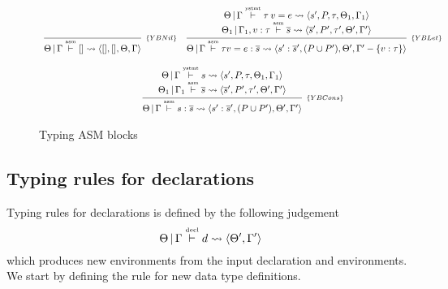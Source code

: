 \documentclass[a4paper, 11pt]{article}
\theoremstyle{definition}
\begin{document}
\begin{figure}[H]
  \[
    \begin{array}{cc}
      \infer[_{\{YBNil\}}]
            {\Theta\,|\,\Gamma \typing{asm} [] \leadsto \langle [], [], \Theta, \Gamma\rangle}
            {}
      &
      \infer[_{\{YBLet\}}]
            {\Theta\,|\,\Gamma \typing{asm} \tau v = e : \overline{s} \leadsto \langle s' : \overline{s}', (P \cup P'), \Theta', \Gamma' - \{v : \tau\}\rangle}
            {\begin{array}{c}
              \Theta\,|\,\Gamma\typing{ystmt} \tau\:v=e \leadsto\langle s', P, \tau, \Theta_1, \Gamma_1 \rangle \\
              \Theta_1\,|\,\Gamma_1, v : \tau \typing{asm} \overline{s} \leadsto \langle \overline{s}', P', \tau', \Theta', \Gamma' \rangle
             \end{array}}
      \\ \\
      \multicolumn{2}{c}{
        \infer[_{\{YBCons\}}]
              {\Theta\,|\,\Gamma \typing{asm} s : \overline{s} \leadsto \langle s' : \overline{s}', (P \cup P'), \Theta', \Gamma'\rangle}
              {\begin{array}{c}
                \Theta\,|\,\Gamma\typing{ystmt} s \leadsto\langle s', P, \tau, \Theta_1, \Gamma_1 \rangle \\
                \Theta_1\,|\,\Gamma_1 \typing{asm} \overline{s} \leadsto \langle \overline{s}', P', \tau', \Theta', \Gamma' \rangle
               \end{array}}
      }
    \end{array}
  \]
  \centering
  \caption{Typing ASM blocks}
  \label{fig:block}
\end{figure}



\subsection{Typing rules for declarations}

Typing rules for declarations is defined by the following judgement
\[\Theta\,|\,\Gamma \overset{\text{\tiny{decl}}}{\vdash} d \leadsto \langle \Theta', \Gamma' \rangle\]
which produces new environments from the input declaration and environments.
We start by defining the rule for new data type definitions.
\end{document}
